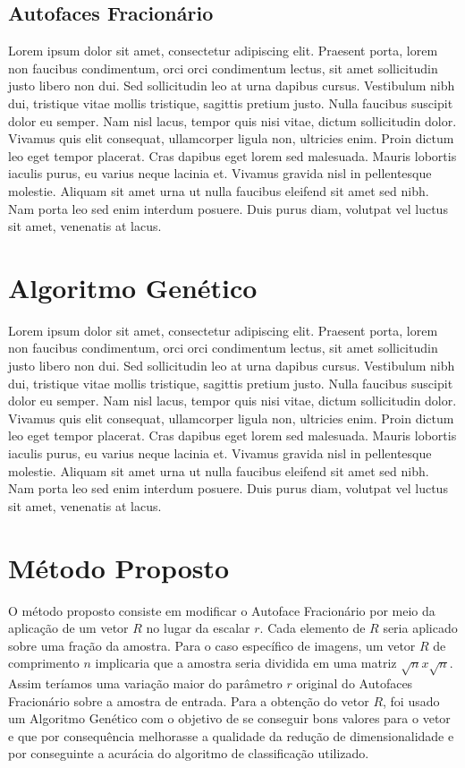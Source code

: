 \documentclass[12pt]{article}
\begin{document}
\subsection{Autofaces Fracionário}

Lorem ipsum dolor sit amet, consectetur adipiscing elit. Praesent porta, lorem non faucibus condimentum, orci orci condimentum lectus, sit amet sollicitudin justo libero non dui. Sed sollicitudin leo at urna dapibus cursus. Vestibulum nibh dui, tristique vitae mollis tristique, sagittis pretium justo. Nulla faucibus suscipit dolor eu semper. Nam nisl lacus, tempor quis nisi vitae, dictum sollicitudin dolor. Vivamus quis elit consequat, ullamcorper ligula non, ultricies enim. Proin dictum leo eget tempor placerat. Cras dapibus eget lorem sed malesuada. Mauris lobortis iaculis purus, eu varius neque lacinia et. Vivamus gravida nisl in pellentesque molestie. Aliquam sit amet urna ut nulla faucibus eleifend sit amet sed nibh. Nam porta leo sed enim interdum posuere. Duis purus diam, volutpat vel luctus sit amet, venenatis at lacus.

\section{Algoritmo Genético}

Lorem ipsum dolor sit amet, consectetur adipiscing elit. Praesent porta, lorem non faucibus condimentum, orci orci condimentum lectus, sit amet sollicitudin justo libero non dui. Sed sollicitudin leo at urna dapibus cursus. Vestibulum nibh dui, tristique vitae mollis tristique, sagittis pretium justo. Nulla faucibus suscipit dolor eu semper. Nam nisl lacus, tempor quis nisi vitae, dictum sollicitudin dolor. Vivamus quis elit consequat, ullamcorper ligula non, ultricies enim. Proin dictum leo eget tempor placerat. Cras dapibus eget lorem sed malesuada. Mauris lobortis iaculis purus, eu varius neque lacinia et. Vivamus gravida nisl in pellentesque molestie. Aliquam sit amet urna ut nulla faucibus eleifend sit amet sed nibh. Nam porta leo sed enim interdum posuere. Duis purus diam, volutpat vel luctus sit amet, venenatis at lacus.  

\section{Método Proposto}

O método proposto consiste em modificar o Autoface Fracionário por meio da aplicação de um vetor $R$ no lugar da escalar $r$. Cada elemento de $R$ seria aplicado sobre uma fração da amostra. Para o caso específico de imagens, um vetor $R$ de comprimento $n$ implicaria que a amostra seria dividida em uma matriz $\sqrt{n}x\sqrt{n}$. Assim teríamos uma variação maior do parâmetro $r$ original do Autofaces Fracionário sobre a amostra de entrada.\newline
\indent
Para a obtenção do vetor $R$, foi usado um Algoritmo Genético com o objetivo de se conseguir bons valores para o vetor e que por consequência melhorasse a qualidade da redução de dimensionalidade e por conseguinte a acurácia do algoritmo de classificação utilizado.
\end{document}
